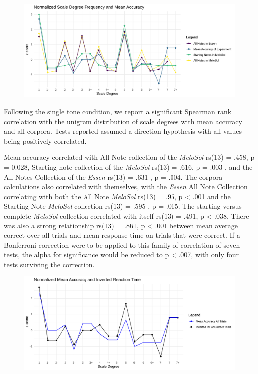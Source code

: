 \documentclass[english,man,floatsintext]{apa6}
\begin{document}
\begin{figure}
\includegraphics[width=9in]{../figures/mean_rt_corpus} \caption{ }\label{fig:unnamed-chunk-1}
\end{figure}

Following the single tone condition, we report a significant Spearman rank correlation with the unigram distribution of scale degrees with mean accuracy and all corpora.
Tests reported assumed a direction hypothesis with all values being positively correlated.

Mean accuracy correlated with All Note collection of the \emph{MeloSol} rs(13) = .458, p = 0.028, Starting note collection of the \emph{MeloSol} rs(13) = .616, p = .003 , and the All Notes Collection of the \emph{Essen} rs(13) = .631 , p = .004.
The corpora calculations also correlated with themselves, with the \emph{Essen} All Note Collection correlating with both the All Note \emph{MeloSol} rs(13) = .95, p \textless{} .001 and the Starting Note \emph{MeloSol} collection rs(13) = .595 , p = .015.
The starting versus complete \emph{MeloSol} collection correlated with itself rs(13) = .491, p \textless{} .038.
There was also a strong relationship rs(13) = .861, p \textless{} .001 between mean average correct over all trials and mean response time on trials that were correct.
If a Bonferroni correction were to be applied to this family of correlation of seven tests, the alpha for significance would be reduced to p \textless{} .007, with only four tests surviving the correction.

\begin{figure}
\includegraphics[width=9in]{../figures/mean_rt_corpus_behavioral} \caption{ }\label{fig:unnamed-chunk-2}
\end{figure}
\end{document}
